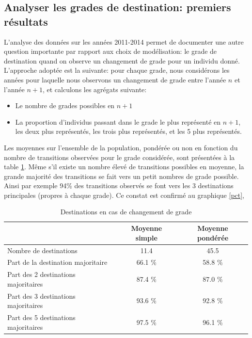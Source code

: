 \documentclass[11pt,a4paper]{article}
\begin{document}
\subsection{Analyser les grades de destination: premiers résultats}

L'analyse des données sur les années 2011-2014 permet de documenter une autre question importante par rapport aux choix de modélisation:
le grade de destination quand on observe un changement de grade pour un individu donné. L'approche adoptée est la suivante: pour chaque grade, 
nous considérons les années pour laquelle nous observons un changement de grade entre l'année $n$ et l'année $n+1$, et calculons les agrégats suivante: 


\begin{itemize}[leftmargin=1cm ,parsep=0cm,itemsep=0cm,topsep=0cm] 
\item Le nombre de grades possibles en $n+1$
\item La proportion d'individus passant dans le grade le plus représenté en $n+1$, les deux plus représentés, les trois plus représentés, et les 5 plus représentés. 
\end{itemize}

Les moyennes sur l'ensemble de la population, pondérée ou non en fonction du nombre de transitions observées pour le grade considérée, sont présentées à la table \ref{means}. Même s'il existe un nombre élevé de transitions possibles en moyenne, la grande majorité des transitions se fait vers un petit nombres de grade possible. Ainsi par exemple 94\% des transitions observés se font vers les 3 destinations principales (propres à chaque grade). Ce constat est confirmé au graphique \ref{pct},

\begin{table}[ht]
\label{means}
\centering
\caption{Destinations en cas de changement de grade} 
\begin{tabular}{l|cc}
  \hline
 & Moyenne simple & Moyenne pondérée \\ 
  \hline
Nombre de destinations & 11.4 & 45.5 \\ 
  Part de la destination majoritaire   & 66.1 \% & 58.8 \%  \\ 
  Part des 2 destinations majoritaires & 87.4 \% & 87.0 \% \\ 
  Part des 3 destinations majoritaires & 93.6 \% & 92.8 \% \\ 
  Part des 5 destinations majoritaires & 97.5 \% & 96.1 \% \\ 
   \hline
\end{tabular}
\end{table}
\end{document}
